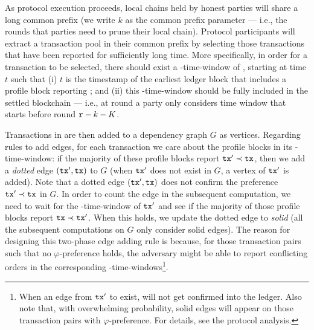 As protocol execution proceeds, local chains held by honest parties will share a long common prefix (we write $k$ as the common prefix parameter --- i.e., the rounds that parties need to prune their local chain).
%
Protocol participants will extract a transaction pool \txpool in their common prefix by selecting those transactions that have been reported for sufficiently long time.
%
More specifically, in order for a transaction \tx to be selected, there should exist a \PBWindowLen-time-window of \tx, starting at time $t$ such that (i) $t$ is the timestamp of the earliest ledger block that includes a profile block \PB reporting \tx; and (ii) this \PBWindowLen-time-window should be fully included in the settled blockchain --- i.e., at round \round a party only considers time window that starts before round $\mathtt{r} - k - K$.

Transactions in \txpool are then added to a dependency graph $G$ as vertices.
%
Regarding rules to add edges, for each transaction \tx we care about the profile blocks in its \PBWindowLen-time-window: if the majority of these profile blocks report $\mathtt{tx}' \prec \mathtt{tx}$, then we add a \emph{dotted} edge $(\mathtt{tx}', \mathtt{tx})$ to $G$ (when $\mathtt{tx}'$ does not exist in $G$, a vertex of $\mathtt{tx}'$ is added).
%
Note that a dotted edge $(\mathtt{tx}', \mathtt{tx})$ does not confirm the preference $\mathtt{tx}' \prec \mathtt{tx}$ in $G$.
%
In order to count the edge in the subsequent computation, we need to wait for the \PBWindowLen-time-window of $\mathtt{tx}'$ and see if the majority of those profile blocks report $\mathtt{tx} \prec \mathtt{tx}'$.
%
When this holds, we update the dotted edge to \emph{solid} (all the subsequent computations on $G$ only consider solid edges).
%
The reason for designing this two-phase edge adding rule is because, for those transaction pairs such that no $\varphi$-preference holds, the adversary might be able to report conflicting orders in the corresponding \PBWindowLen-time-windows\footnote{When an edge from $\mathtt{tx}'$ to \tx exist, \tx will not get confirmed into the ledger. Also note that, with overwhelming probability, solid edges will appear on those transaction pairs with $\varphi$-preference. For details, see the protocol analysis.}.

